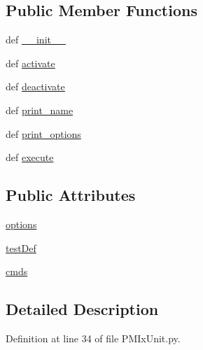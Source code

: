 \subsection*{Public Member Functions}
\begin{DoxyCompactItemize}
\item 
def \hyperlink{class_p_m_ix_unit_1_1_p_m_ix_unit_a01b0f667b854dc0d7051c071d01f2cdb}{\-\_\-\-\_\-init\-\_\-\-\_\-}
\item 
def \hyperlink{class_p_m_ix_unit_1_1_p_m_ix_unit_af9eb3845f804e5cff57f0b96a5c1d912}{activate}
\item 
def \hyperlink{class_p_m_ix_unit_1_1_p_m_ix_unit_a77590898cef9e5d560857e25a00ee287}{deactivate}
\item 
def \hyperlink{class_p_m_ix_unit_1_1_p_m_ix_unit_a64943a4530694aa835f021d0442fc8dd}{print\-\_\-name}
\item 
def \hyperlink{class_p_m_ix_unit_1_1_p_m_ix_unit_a716d70327c8f43718a74e99e87eb05e1}{print\-\_\-options}
\item 
def \hyperlink{class_p_m_ix_unit_1_1_p_m_ix_unit_a692047ba1b5639b1c02f25922cd014bb}{execute}
\end{DoxyCompactItemize}
\subsection*{Public Attributes}
\begin{DoxyCompactItemize}
\item 
\hyperlink{class_p_m_ix_unit_1_1_p_m_ix_unit_a6c56979e7226a414874653b3e7a17dd8}{options}
\item 
\hyperlink{class_p_m_ix_unit_1_1_p_m_ix_unit_a08b01eaf2867a0a02f8598018739e843}{test\-Def}
\item 
\hyperlink{class_p_m_ix_unit_1_1_p_m_ix_unit_a1130f07074aeff223235a147440868c4}{cmds}
\end{DoxyCompactItemize}


\subsection{Detailed Description}


Definition at line 34 of file P\-M\-Ix\-Unit.\-py.



